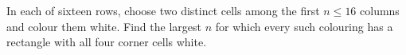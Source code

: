 In each of sixteen rows, choose two distinct cells among the first $n\le16$ columns and colour them white. Find the largest $n$ for which every such colouring has a rectangle with all four corner cells white.
